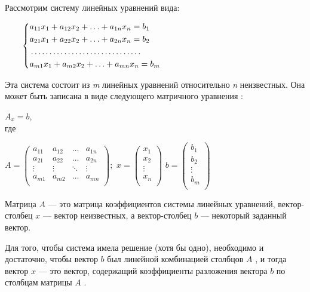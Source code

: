 \documentclass[12pt,a4paper]{article}
\author{Давиденко Алексей}
\begin{document}
Рассмотрим систему линейных уравнений вида:\\
\par$\qquad
\left\{\begin{aligned}
& a_{11}x_1 + a_{12}x_2 + \ldots + a_{1n}x_n=b_1\\
& a_{21}x_1 + a_{22}x_2 + \ldots + a_{2n}x_n=b_2\\
&\ldots \ldots \ldots \ldots \ldots \ldots \ldots \ldots \ldots \ldots \\
& a_{m1}x_1 + a_{m2}x_2 + \ldots + a_{mn}x_n=b_m\\
\end{aligned}\right.\\
$

Эта система состоит из {\it m} линейных уравнений относительно {\it n} неизвестных. Она может быть записана в виде следующего матричного уравнения :
 \par $A_x = b$,\\
где

\par $A=
\left(\begin{matrix}
a_{11} & a_{12} & \ldots & a_{1n}\\
a_{21} & a_{22} & \ldots & a_{2n}\\
\vdots & \vdots & \ddots & \vdots\\
a_{m1} & a_{m2} & \ldots & a_{mn}\\
\end{matrix}\right);
$
$x=
\left(\begin{matrix}
x_1 \\
x_2 \\
\vdots \\
x_n \\
\end{matrix}\right)
$
$b=
\left(\begin{matrix}
b_1\\
b_2\\
\vdots\\
b_m\\
\end{matrix}\right)
$
\\
\par Матрица $A$ — это матрица коэффициентов системы линейных уравнений, вектор-столбец $x$  — вектор неизвестных, а вектор-столбец $b$ — некоторый заданный вектор.\\

\par Для того, чтобы система имела решение (хотя бы одно), необходимо и достаточно, чтобы вектор $b$ был линейной комбинацией столбцов $A$ , и тогда вектор $x$  — это вектор, содержащий коэффициенты разложения вектора $b$  по столбцам матрицы $A$ .
\end{document}
